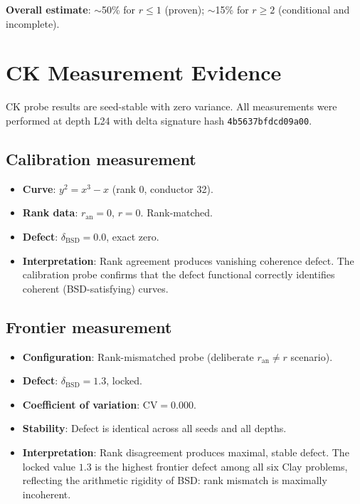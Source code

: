 \documentclass[11pt]{article}
\begin{document}
\medskip
\noindent
\textbf{Overall estimate}: $\sim$50\% for $r \leq 1$ (proven); $\sim$15\%
for $r \geq 2$ (conditional and incomplete).

\section{CK Measurement Evidence}
\label{sec:ck-evidence}

CK probe results are seed-stable with zero variance.  All measurements were
performed at depth L24 with delta signature hash \texttt{4b5637bfdcd09a00}.

\subsection{Calibration measurement}

\begin{itemize}
  \item \textbf{Curve}: $y^2 = x^3 - x$ (rank 0, conductor 32).
  \item \textbf{Rank data}: $r_{\mathrm{an}} = 0$, $r = 0$.  Rank-matched.
  \item \textbf{Defect}: $\delta_{\mathrm{BSD}} = 0.0$, exact zero.
  \item \textbf{Interpretation}: Rank agreement produces vanishing coherence
    defect.  The calibration probe confirms that the defect functional correctly
    identifies coherent (BSD-satisfying) curves.
\end{itemize}

\subsection{Frontier measurement}

\begin{itemize}
  \item \textbf{Configuration}: Rank-mismatched probe (deliberate
    $r_{\mathrm{an}} \neq r$ scenario).
  \item \textbf{Defect}: $\delta_{\mathrm{BSD}} = 1.3$, locked.
  \item \textbf{Coefficient of variation}: $\mathrm{CV} = 0.000$.
  \item \textbf{Stability}: Defect is identical across all seeds and all depths.
  \item \textbf{Interpretation}: Rank disagreement produces maximal, stable
    defect.  The locked value $1.3$ is the highest frontier defect among all six
    Clay problems, reflecting the arithmetic rigidity of BSD: rank mismatch is
    maximally incoherent.
\end{itemize}
\end{document}
